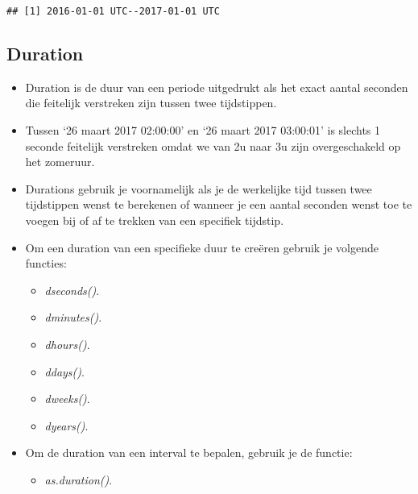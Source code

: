 \documentclass[]{memoir}
\newenvironment{Shaded}{\begin{snugshade}}{\end{snugshade}}
\newcommand{\StringTok}[1]{\textcolor[rgb]{0.31,0.60,0.02}{#1}}
\newcommand{\OperatorTok}[1]{\textcolor[rgb]{0.81,0.36,0.00}{\textbf{#1}}}
\newcommand{\NormalTok}[1]{#1}
\providecommand{\tightlist}{%
  \setlength{\itemsep}{0pt}\setlength{\parskip}{0pt}}
\begin{document}
\begin{Shaded}
\end{Shaded}

\begin{verbatim}
## [1] 2016-01-01 UTC--2017-01-01 UTC
\end{verbatim}

\subsection{Duration}\label{duration}

\begin{itemize}
\tightlist
\item
  Duration is de duur van een periode uitgedrukt als het exact aantal
  seconden die feitelijk verstreken zijn tussen twee tijdstippen.
\item
  Tussen `26 maart 2017 02:00:00' en `26 maart 2017 03:00:01' is slechts
  1 seconde feitelijk verstreken omdat we van 2u naar 3u zijn
  overgeschakeld op het zomeruur.
\item
  Durations gebruik je voornamelijk als je de werkelijke tijd tussen
  twee tijdstippen wenst te berekenen of wanneer je een aantal seconden
  wenst toe te voegen bij of af te trekken van een specifiek tijdstip.
\item
  Om een duration van een specifieke duur te creëren gebruik je volgende
  functies:

  \begin{itemize}
  \tightlist
  \item
    \emph{dseconds()}.
  \item
    \emph{dminutes()}.
  \item
    \emph{dhours()}.
  \item
    \emph{ddays()}.
  \item
    \emph{dweeks()}.
  \item
    \emph{dyears()}.
  \end{itemize}
\item
  Om de duration van een interval te bepalen, gebruik je de functie:

  \begin{itemize}
  \tightlist
  \item
    \emph{as.duration()}.
  \end{itemize}
\end{itemize}
\end{document}
